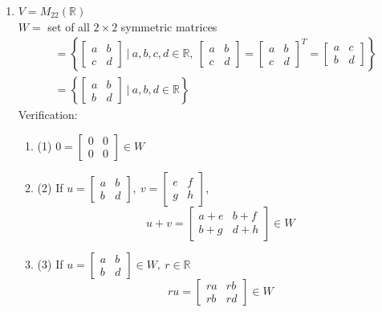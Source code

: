 \documentclass[]{article}
\begin{document}
		\begin{enumerate}
			\item $V=M_{22}(\mathbb{R})$\\
			$W=$ set of all $2\times 2$ symmetric matrices
			\begin{align*}
				&=\left\{\begin{bmatrix}{a}&{b}\\{c}&{d}\end{bmatrix}~|~a,b,c,d\in\mathbb{R},~\begin{bmatrix}{a}&{b}\\{c}&{d}\end{bmatrix}=\begin{bmatrix}{a}&{b}\\{c}&{d}\end{bmatrix}^T=\begin{bmatrix}{a}&{c}\\{b}&{d}\end{bmatrix}\right\}\\
				&=\left\{\begin{bmatrix}{a}&{b}\\{b}&{d}\end{bmatrix}~|~a,b,d\in\mathbb{R}\right\}
			\end{align*}
			Verification:
			\begin{enumerate}
				\item (1) $0=\begin{bmatrix}{0}&{0}\\{0}&{0}\end{bmatrix}\in W$
				\item (2) If $u=\begin{bmatrix}{a}&{b}\\{b}&{d}\end{bmatrix},~v=\begin{bmatrix}{e}&{f}\\{g}&{h}\end{bmatrix}$,
				$$
					u+v=\begin{bmatrix}{a+e}&{b+f}\\{b+g}&{d+h}\end{bmatrix}\in W
				$$
				\item (3) If $u=\begin{bmatrix}{a}&{b}\\{b}&{d}\end{bmatrix}\in W,~r\in\mathbb{R}$
				$$
					ru=\begin{bmatrix}{ra}&{rb}\\{rb}&{rd}\end{bmatrix}\in W
				$$
			\end{enumerate}
		\end{enumerate}
\end{document}
